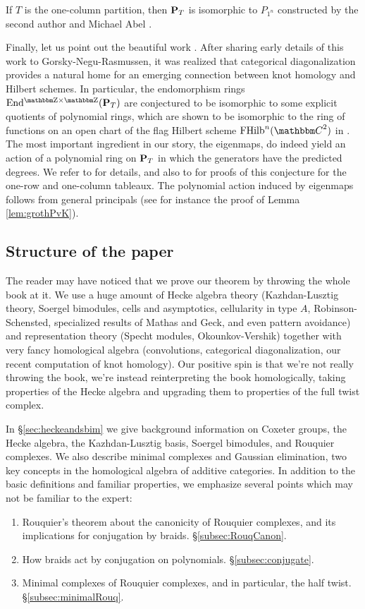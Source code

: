 If $T$ is the one-column partition, then ${\mathbf P}_T$ is isomorphic to $P_{1^n}$ constructed by the second author and Michael Abel \cite{AbHog17}.

Finally, let us point out the beautiful work \cite{GNR16}.  After sharing early details of this work to Gorsky-Negu-Rasmussen, it was realized that categorical diagonalization provides a natural home for an emerging connection between knot homology and Hilbert schemes.  In particular, the endomorphism rings $\Endgg(\PB_T)$ are conjectured to be isomorphic to some explicit quotients of polynomial rings, which are shown to be isomorphic to the ring of functions on an open chart of the flag Hilbert scheme $\FHilb^n(\C^2)$ in \cite{GNR16}.  The most important ingredient in our story, the eigenmaps, do indeed yield an action of a polynomial ring on ${\mathbf P}_T$ in which the generators have the predicted degrees.  We refer to \cite{GNR16} for details, and also to \cite{Hog15,AbHog17} for proofs of this conjecture for the one-row and one-column tableaux.  The polynomial action induced by eigenmaps follows from general principals (see for instance the proof of Lemma \ref{lem:grothPvK}).


\subsection{Structure of the paper}

The reader may have noticed that we prove our theorem by throwing the whole book at it. We use a huge amount of Hecke algebra theory (Kazhdan-Lusztig theory, Soergel bimodules, cells and
asymptotics, cellularity in type $A$, Robinson-Schensted, specialized results of Mathas and Geck, and even pattern avoidance) and representation theory (Specht modules, Okounkov-Vershik)
together with very fancy homological algebra (convolutions, categorical diagonalization, our recent computation of knot homology). Our positive spin is that we're not really throwing the
book, we're instead reinterpreting the book homologically, taking properties of the Hecke algebra and upgrading them to properties of the full twist complex.

In \S\ref{sec:heckeandsbim} we give background information on Coxeter groups, the Hecke algebra, the Kazhdan-Lusztig basis, Soergel bimodules, and Rouquier complexes. We also describe
minimal complexes and Gaussian elimination, two key concepts in the homological algebra of additive categories. In addition to the basic definitions and familiar properties, we emphasize
several points which may not be familiar to the expert: \begin{enumerate} \item Rouquier's theorem about the canonicity of Rouquier complexes, and its implications for conjugation by
braids. \S\ref{subsec:RouqCanon}. \item How braids act by conjugation on polynomials. \S\ref{subsec:conjugate}. \item Minimal complexes of Rouquier complexes, and in particular, the half twist. \S\ref{subsec:minimalRouq}.
\end{enumerate}

